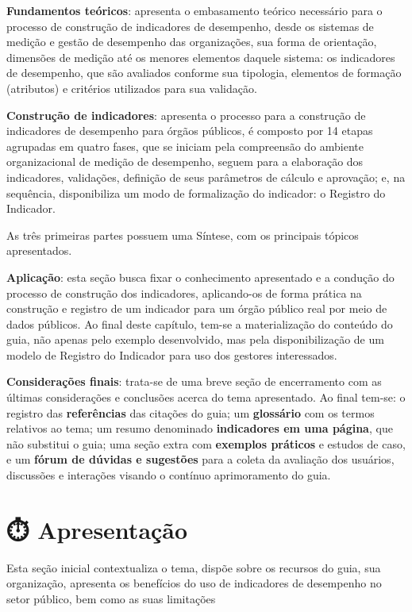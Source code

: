 \documentclass[
  letterpaper,
  DIV=11,
  numbers=noendperiod]{scrreprt}
\begin{document}
\textbf{Fundamentos teóricos}: apresenta o embasamento teórico
necessário para o processo de construção de indicadores de desempenho,
desde os sistemas de medição e gestão de desempenho das organizações,
sua forma de orientação, dimensões de medição até os menores elementos
daquele sistema: os indicadores de desempenho, que são avaliados
conforme sua tipologia, elementos de formação (atributos) e critérios
utilizados para sua validação.

\textbf{Construção de indicadores}: apresenta o processo para a
construção de indicadores de desempenho para órgãos públicos, é composto
por 14 etapas agrupadas em quatro fases, que se iniciam pela compreensão
do ambiente organizacional de medição de desempenho, seguem para a
elaboração dos indicadores, validações, definição de seus parâmetros de
cálculo e aprovação; e, na sequência, disponibiliza um modo de
formalização do indicador: o Registro do Indicador.

As três primeiras partes possuem uma Síntese, com os principais tópicos
apresentados.

\textbf{Aplicação}: esta seção busca fixar o conhecimento apresentado e
a condução do processo de construção dos indicadores, aplicando-os de
forma prática na construção e registro de um indicador para um órgão
público real por meio de dados públicos. Ao final deste capítulo, tem-se
a materialização do conteúdo do guia, não apenas pelo exemplo
desenvolvido, mas pela disponibilização de um modelo de Registro do
Indicador para uso dos gestores interessados.

\textbf{Considerações finais}: trata-se de uma breve seção de
encerramento com as últimas considerações e conclusões acerca do tema
apresentado. Ao final tem-se: o registro das \textbf{referências} das
citações do guia; um \textbf{glossário} com os termos relativos ao tema;
um resumo denominado \textbf{indicadores em uma página}, que não
substitui o guia; uma seção extra com \textbf{exemplos práticos} e
estudos de caso, e um \textbf{fórum de dúvidas e sugestões} para a
coleta da avaliação dos usuários, discussões e interações visando o
contínuo aprimoramento do guia.

\part{⏱️ Apresentação}

{Esta seção inicial contextualiza o tema, dispõe sobre os recursos do
guia, sua organização, apresenta os benefícios do uso de indicadores de
desempenho no setor público, bem como as suas limitações}
\end{document}
